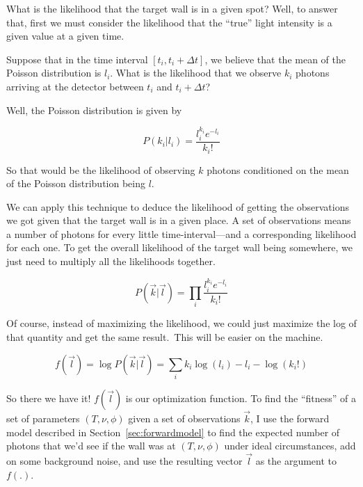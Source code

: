 \documentclass[11pt]{article}
\begin{document}
What is the likelihood that the target wall is in a given spot? Well, to answer that, first we must consider the likelihood that the ``true'' light intensity is a given value at a given time.

Suppose that in the time interval $[t_i, t_i+\Delta t]$, we believe that the mean of the Poisson distribution is $l_i$. What is the likelihood that we observe $k_i$ photons arriving at the detector between $t_i$ and $t_i + \Delta t$?

Well, the Poisson distribution is given by

\begin{equation}
    P(k_i | l_i) = \frac{l_i^{k_i} e^{-l_i}}{k_i!} 
\end{equation}

So that would be the likelihood of observing $k$ photons conditioned on the mean of the Poisson distribution being $l$.

We can apply this technique to deduce the likelihood of getting the observations we got given that the target wall is in a given place. A set of observations means a number of photons for every little time-interval---and a corresponding likelihood for each one. To get the overall likelihood of the target wall being somewhere, we just need to multiply all the likelihoods together.

\begin{equation}
    P(\vec{k} | \vec{l}) = \prod_{i} \frac{l_i^{k_i} e^{-l_i}}{k_i!} 
\end{equation}

Of course, instead of maximizing the likelihood, we could just maximize the log of that quantity and get the same result.\footnotemark~This will be easier on the machine.


\begin{equation}
    f(\vec{l}) = \log P(\vec{k} | \vec{l}) = \sum_{i} k_i\log(l_i) - l_i - \log(k_i!) 
\end{equation}

So there we have it! $f(\vec{l})$ is our optimization function. To find the ``fitness'' of a set of parameters $(T, \nu, \phi)$ given a set of observations $\vec{k}$, I use the forward model described in Section~\ref{sec:forwardmodel} to find the expected number of photons that we'd see if the wall was at $(T, \nu, \phi)$ under ideal circumstances, add on some background noise, and use the resulting vector $\vec{l}$ as the argument to $f(.)$.
\end{document}
